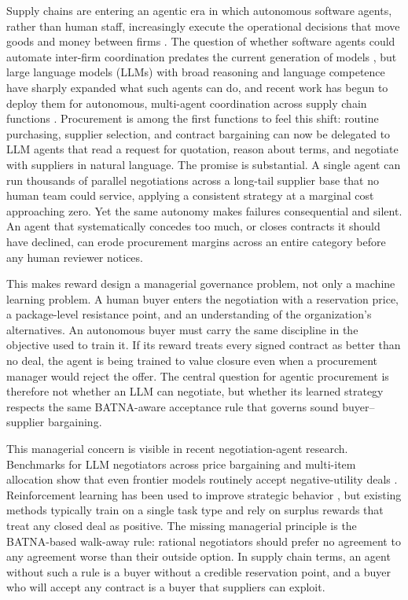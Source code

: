 \documentclass{interact}
\theoremstyle{plain}
\theoremstyle{definition}
\theoremstyle{remark}
\begin{document}
Supply chains are entering an agentic era in which autonomous software agents, rather than human staff, increasingly execute the operational decisions that move goods and money between firms \cite{revilla2023ai,menache2025generative}. The question of whether software agents could automate inter-firm coordination predates the current generation of models \cite{xu2021bots}, but large language models (LLMs) with broad reasoning and language competence \cite{bubeck2023sparks} have sharply expanded what such agents can do, and recent work has begun to deploy them for autonomous, multi-agent coordination across supply chain functions \cite{jannelli2024agentic,li2025chatsync}. Procurement is among the first functions to feel this shift: routine purchasing, supplier selection, and contract bargaining can now be delegated to LLM agents that read a request for quotation, reason about terms, and negotiate with suppliers in natural language. The promise is substantial. A single agent can run thousands of parallel negotiations across a long-tail supplier base that no human team could service, applying a consistent strategy at a marginal cost approaching zero. Yet the same autonomy makes failures consequential and silent. An agent that systematically concedes too much, or closes contracts it should have declined, can erode procurement margins across an entire category before any human reviewer notices.

This makes reward design a managerial governance problem, not only a machine learning problem. A human buyer enters the negotiation with a reservation price, a package-level resistance point, and an understanding of the organization's alternatives. An autonomous buyer must carry the same discipline in the objective used to train it. If its reward treats every signed contract as better than no deal, the agent is being trained to value closure even when a procurement manager would reject the offer. The central question for agentic procurement is therefore not whether an LLM can negotiate, but whether its learned strategy respects the same BATNA-aware acceptance rule that governs sound buyer--supplier bargaining.

This managerial concern is visible in recent negotiation-agent research. Benchmarks for LLM negotiators across price bargaining and multi-item allocation show that even frontier models routinely accept negative-utility deals \cite{xia2024measuring, kwon2024llmseffectivenegotiators, bianchi2024negotiationarena, noh2024personalities, chatterjee2024agreemate, hua2024gametheoretic}. Reinforcement learning has been used to improve strategic behavior \cite{liu2026instructing, bergemann2026bilateral, vendrell2026gametalk, zeng2025repo, long2025evoemo, oh2026merit}, but existing methods typically train on a single task type and rely on surplus rewards that treat any closed deal as positive. The missing managerial principle is the BATNA-based walk-away rule: rational negotiators should prefer no agreement to any agreement worse than their outside option. In supply chain terms, an agent without such a rule is a buyer without a credible reservation point, and a buyer who will accept any contract is a buyer that suppliers can exploit.
\end{document}
